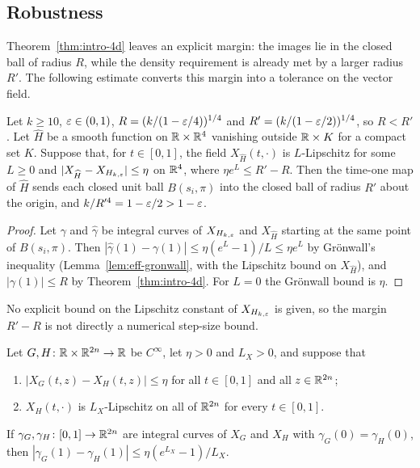 \subsection{Robustness}\label{sec:intro-contribution}

Theorem~\ref{thm:intro-4d} leaves an explicit margin: the images lie in the closed ball of radius $R$, while the
density requirement is already met by a larger radius $R'$. The following estimate converts this margin into a
tolerance on the vector field.

\begin{mainproposition}[Robustness]\label{thm:intro-stability}
Let $k\ge10$, $\varepsilon\in(0,1)$, $R=(k/(1-\varepsilon/4))^{1/4}$ and $R'=(k/(1-\varepsilon/2))^{1/4}$, so $R<R'$. Let $\widehat H$ be a smooth function on $\mathbb{R}\times\mathbb{R}^4$
vanishing outside $\mathbb{R}\times K$ for a compact set $K$. Suppose that, for $t\in[0,1]$, the field $X_{\widehat H}(t,\cdot)$
is $L$-Lipschitz for some $L\ge0$ and $|X_{\widehat H}-X_{H_{k,\varepsilon}}|\le\eta$ on $\mathbb{R}^4$, where $\eta e^L\le R'-R$. Then the time-one map
of $\widehat H$ sends each closed unit ball $B(s_i,\pi)$ into the closed ball of radius $R'$ about the origin, and
$k/R'^4=1-\varepsilon/2>1-\varepsilon$.
\end{mainproposition}

\begin{proof}
Let $\gamma$ and $\hat\gamma$ be integral curves of $X_{H_{k,\varepsilon}}$ and $X_{\widehat H}$ starting at the same point of
$B(s_i,\pi)$. Then $|\hat\gamma(1)-\gamma(1)|\le\eta(e^L-1)/L\le\eta e^L$ by Gr\"onwall's inequality
(Lemma~\ref{lem:eff-gronwall}, with the Lipschitz bound on $X_{\widehat H}$), and $|\gamma(1)|\le R$ by
Theorem~\ref{thm:intro-4d}. For $L=0$ the Gr\"onwall bound is $\eta$.
\end{proof}

No explicit bound on the Lipschitz constant of $X_{H_{k,\varepsilon}}$ is given, so the margin $R'-R$ is not
directly a numerical step-size bound.

\begin{lemma}[Gr\"onwall]\label{lem:eff-gronwall}
Let $G,H\colon\mathbb{R}\times\mathbb{R}^{2n}\to\mathbb{R}$ be $C^\infty$, let $\eta>0$ and $L_X>0$, and suppose that
\begin{enumerate}[label=(\roman*)]
\item $|X_G(t,z)-X_H(t,z)|\le\eta$ for all $t\in[0,1]$ and all $z\in\mathbb{R}^{2n}$;
\item $X_H(t,\cdot)$ is $L_X$-Lipschitz on all of $\mathbb{R}^{2n}$ for every $t\in[0,1]$.
\end{enumerate}
If $\gamma_G,\gamma_H\colon[0,1]\to\mathbb{R}^{2n}$ are integral curves of $X_G$ and $X_H$ with
$\gamma_G(0)=\gamma_H(0)$, then $|\gamma_G(1)-\gamma_H(1)|\le\eta(e^{L_X}-1)/L_X$.
\end{lemma}

